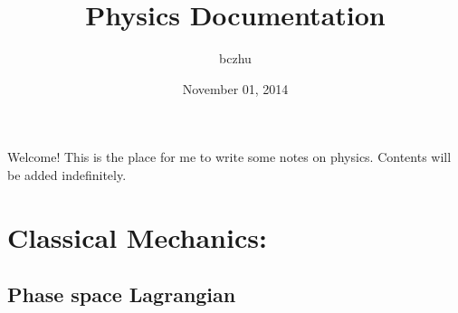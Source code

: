 \documentclass[letterpaper,10pt,english]{sphinxmanual}
\title{Physics Documentation}
\date{November 01, 2014}
\author{bczhu}
\begin{document}
\maketitle
\tableofcontents
{}\label{index::doc}


Welcome! This is the place for me to write some notes on physics. Contents will be added indefinitely.


\chapter{Classical Mechanics:}
\label{index:classical-mechanics}\label{index:notes-on-physics}

\section{Phase space Lagrangian}
\label{CM/Lagrangian::doc}\label{CM/Lagrangian:phase-space-lagrangian}\label{CM/Lagrangian:id1}
\end{document}
